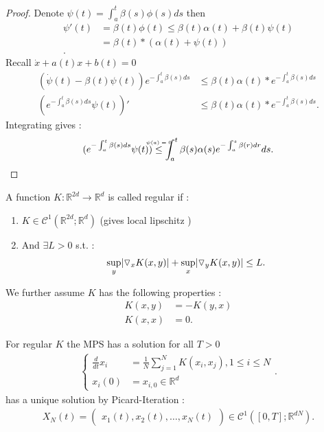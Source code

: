 \begin{proof}[Proof]
  Denote $\psi(t) = \int_a^{t} \beta(s) \phi(s) ds $ then 
  \begin{align*}
    \psi'(t) &= \beta(t)\phi(t) \le \beta(t)\alpha(t) + \beta(t)\psi(t) \\
             &= \beta(t) * (\alpha(t) + \psi(t))\\
  .\end{align*}
  Recall $\dot{x} + a(t)x + b(t) = 0$
  \begin{align*}
    (\dot{\psi}(t) - \beta(t)\psi(t) )e^{- \int_a^{t}\beta(s) ds } &\le  \beta(t)\alpha(t)*e^{-\int_a^{t} \beta(s) ds } \\
    (e^{- \int_a^{t}\beta(s) ds } \psi(t))' &\le \beta(t) \alpha(t)*e^{-\int_a^{t} \beta(s) ds } 
  .\end{align*}
  Integrating gives : 
  \begin{align*}
    (e^{- \int_a^{t}\beta(s) ds } \psi(t)) \myS{$\psi(a) =0$}{\le } \int_a^{t} \beta(s) \alpha(s) e^{-\int_a^{s}\beta(r) dr } ds  
  .\end{align*}
\end{proof}
\begin{definition}[Regularity]
  A function $K : \mathbb{R}^{2d} \to \mathbb{R}^{d}  $ is called regular if :
  \begin{enumerate}
    \item $K \in  \mathcal{C}^{1}(\mathbb{R}^{2d};\mathbb{R}^{d}  ) $ (gives local lipschitz ) 
    \item And $\exists  L >0 $ s.t. : 
      \begin{align*}
        \sup_{y} \lvert\triangledown_x K(x,y) \rvert + \sup_{x} \lvert\triangledown_y K(x,y)\rvert  \le L
      .\end{align*}
  \end{enumerate} 
\end{definition}
\begin{remark}
We further assume $K$ has the following properties :
  \begin{align*}
  K(x,y) &= -K(y,x) \tag{antisymmetric}\\
    K(x,x) &= 0 
.\end{align*}
\end{remark}
 \begin{theorem}
 For regular $K$ the MPS has a solution for all $T>0$
\begin{align*}
  \begin{cases}
    \frac{d}{dt} x_i &= \frac{1}{N} \sum_{j=1}^{N} K(x_i,x_j) ,  1\le i \le N \\ 
    x_i(0)  &= x_{i,0} \in \mathbb{R}^{d} 
  \end{cases}
 .\end{align*}
 has a unique solution by Picard-Iteration : 
 \begin{align*}
   X_N(t) = \begin{pmatrix} x_1(t),x_2(t),\ldots ,x_N(t) \end{pmatrix}  \in \mathcal{C}^{1}([0,T];\mathbb{R}^{dN} ) 
 .\end{align*}
 \end{theorem}

